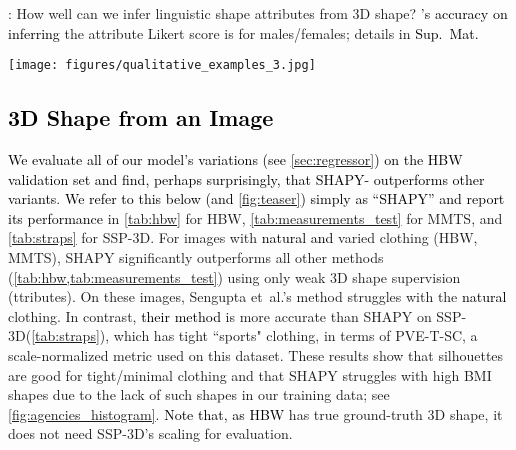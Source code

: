 \documentclass[10pt,twocolumn,letterpaper]{article}
\newcommand{\qheading}[1]{\noindent\textbf{#1}:}
\newcommand{\modelCOLOR}{black}
\newcommand{\modelname}{{\color{\modelCOLOR}SHAPY}\xspace}
\newcommand{\colorattr}{\color{PineGreen}}
\newcommand{\StoA}{\text{\mbox{S2A}}\xspace}
\newcommand{\shapyA}{\mbox{\modelname-{\colorattr{A}}}\xspace}
\newcommand{\threeD}{3D\xspace}
\newcommand{\mmts}{MMTS\xspace}
\newcommand{\ssp}{\mbox{SSP-\threeD}\xspace}
\newcommand{\hbw}{\mbox{HBW}\xspace}
\newcommand{\bmi}{\mbox{BMI}\xspace}
\newcommand{\supmat}{{\mbox{\textcolor{black}{Sup.~Mat.}}}\xspace}
\renewcommand{\etal}{\mbox{et al.}\xspace}
\newcommand{\rgb}{\mbox{RGB}\xspace}
\newcommand{\cameraready}[1]{\textcolor{Fuchsia}{{#1}}\xspace}
\renewcommand{\cameraready}[1]{\textcolor{black}{{#1}}\xspace}
\newcommand{\colorTERM}{blue}
\renewcommand{\colorTERM}{black}
\newcommand{\linguisticshapeattributes}[0]{{\color{\colorTERM}linguistic shape attributes}\xspace}
\begin{document}
\smallskip
\qheading{\StoA}
How well can we infer \linguisticshapeattributes from \threeD shape?
\cameraready{\StoA's accuracy on inferring} the attribute Likert score is
 for males/females; details in \supmat


\begin{figure*}
    \centering
    \texttt{[image: figures/qualitative\_examples\_3.jpg]}
	\caption{Qualitative results from \hbw. 
    From left to right: \rgb,  ground-truth shape,
    \modelname and Sengupta \etal \cite{sengupta2021hierarchicalICCV}.
    \cameraready{For example, in the upper- and lower- right images, \modelname is less affected by pose variation and loose clothing.}
    }
\label{fig:resultimages}
\end{figure*} 

\subsection{\cameraready{\threeD Shape from an Image}}


\cameraready{We evaluate all of our model's variations (see \cref{sec:regressor}) on the \hbw validation set and find, perhaps surprisingly, that \shapyA outperforms other variants}. 
\cameraready{We refer to this below (and \cref{fig:teaser}) simply as ``\modelname'' and report its performance} in \cref{tab:hbw} for \hbw, \cref{tab:measurements_test} for \mmts, and \cref{tab:straps} for \ssp. 
For images with \cameraready{natural and} varied clothing (\hbw, \mmts), \modelname significantly outperforms all other methods
(\cref{tab:hbw,tab:measurements_test}) 
using only weak \threeD shape supervision ({\colorattr{A}}ttributes). 
On these images, Sengupta \etal's method \cite{sengupta2021hierarchicalICCV} struggles with the \cameraready{natural} clothing.
In contrast, \cameraready{their method} is more accurate than \modelname on \ssp (\cref{tab:straps}), which has tight ``sports" clothing, in terms of \mbox{PVE-T-SC}, a scale-normalized metric used on this dataset. 
These results show that silhouettes are good for tight/minimal clothing and that \modelname struggles with high \bmi shapes due to the lack of such shapes in our training data; see \cref{fig:agencies_histogram}.
\cameraready{Note that, as \hbw}
has true ground-truth \threeD shape, it does not need \ssp's scaling for evaluation. 



\def\boxit#1{\smash{\color{Fuchsia}\fboxrule=1pt\relax\fboxsep=2pt\relax \llap{\rlap{\fbox{\vphantom{0}\makebox[#1]{}}}~}}\ignorespaces
}
\end{document}
